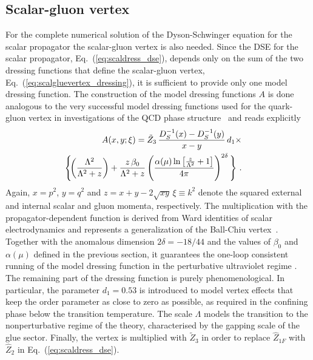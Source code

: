 \documentclass[final,twocolumn,merge,sort&compress]{elsarticle}
\def\Eq#1{Eq.~(\ref{#1})}
\begin{document}
\begin{figure*}
  \centering
  \hfill
  \caption{\label{fig:scalarprop} Scalar propagator,
    Eq.~\eqref{eq:scaldress_dse_T}, for periodic $\omega_0 (0)= 0$
    (left) and for antiperiodic $\omega_0(\pi)=\pi T$ (right) boundary
    conditions as a function of momenta for different temperatures
    ($\mu = 4$ GeV and $m = 1.5$ GeV).}
\end{figure*}

\subsection{Scalar-gluon vertex}
\label{sec:vertex}

For the complete numerical solution of the Dyson-Schwinger equation
for the scalar propagator the scalar-gluon vertex is also needed.
Since the DSE for the scalar propagator, \Eq{eq:scaldress_dse},
depends only on the sum of the two dressing functions that define the
scalar-gluon vertex, \Eq{eq:scalgluevertex_dressing}, it is sufficient
to provide only one model dressing function. The construction of the
model dressing functions $A$ is done analogous to the very successful
model dressing functions used for the quark-gluon vertex in
investigations of the QCD phase structure~\cite{Fischer:2010fx} and
reads explicitly
\begin{eqnarray}
\label{eq:scalgluevert_model}
 && \hspace{-0.75cm} A(x,y;\xi) = \tilde{Z}_3\, \frac{D_S^{-1}(x)-D_S^{-1}(y)}{x-y}\, d_1\times 
  \\ && \hspace{-0.75cm} \Bigg\{\!\!\left(\frac{\Lambda^2}{\Lambda^2 + z}\right) 
   + \frac{z\, \beta_0}{\Lambda^2 + z} \left(\frac{\alpha(\mu)
      \ln\left[\frac{z}{\Lambda^2} + 1\right]}{4\pi} \right)^{2\delta}\Bigg\} \ . \nonumber
\end{eqnarray}
Again, $x=p^2$, $y=q^2$ and $z=x+y-2\sqrt{xy}\,\xi \equiv k^2$ denote
the squared external and internal scalar and gluon momenta,
respectively.  The multiplication with the propagator-dependent
function is derived from Ward identities of scalar electrodynamics and
represents a generalization of the Ball-Chiu
vertex~\cite{Ball:1980ay, Ball:1980ax}.  Together with the anomalous dimension
$2\delta=-18/44$ and the values of $\beta_0$ and $\alpha(\mu)$ defined
in the previous section, it guarantees the one-loop consistent running
of the model dressing function in the perturbative ultraviolet regime
\cite{Fischer:2003rp}. The remaining part of the dressing function is
purely phenomenological. In particular, the parameter $d_1=0.53$
is introduced to model vertex effects that keep the 
order parameter as close to zero as possible, as required in the confining phase
below the transition temperature. 
The scale $\Lambda$ models the transition to the
nonperturbative regime of the theory, characterised by the gapping
scale of the glue sector. Finally, the vertex is multiplied with
$\tilde{Z}_3$ in order to replace $\hat{Z}_{1F}$ with $\hat{Z}_2$ in
\Eq{eq:scaldress_dse}.
\end{document}
